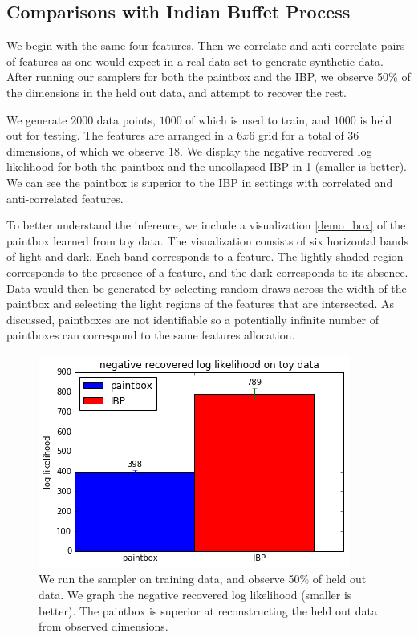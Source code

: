 \documentclass{article}
\begin{document}
\subsection{Comparisons with Indian Buffet Process}

We begin with the same four features. Then we correlate and anti-correlate pairs of features as one would expect in a real data set to generate synthetic data.  After running our samplers for both the paintbox and the IBP, we observe 50\% of the dimensions in the held out data, and attempt to recover the rest.  

We generate $2000$ data points, $1000$ of which is used to train, and $1000$ is held out for testing.  The features are arranged in a $6x6$ grid for a total of $36$ dimensions, of which we observe $18$. We display the negative recovered log likelihood for both the paintbox and the uncollapsed IBP in \ref{demo} (smaller is better).  We can see the paintbox is superior to the IBP in settings with correlated and anti-correlated features. 

To better understand the inference, we include a visualization \ref{demo_box} of the paintbox learned from toy data.  The visualization consists of six horizontal bands of light and dark.  Each band corresponds to a feature.  The lightly shaded region corresponds to the presence of a feature, and the dark corresponds to its absence.  Data would then be generated by selecting random draws across the width of the paintbox and selecting the light regions of the features that are intersected.  As discussed, paintboxes are not identifiable so a potentially infinite number of paintboxes can correspond to the same features allocation. 

\begin{figure}[demo]
\vskip 0.2in
\begin{center}
\centerline{\includegraphics[width=\columnwidth]{demo}}
\caption{We run the sampler on training data, and observe 50\% of held out data.  We graph the negative recovered log likelihood (smaller is better).  The paintbox is superior at reconstructing the held out data from observed dimensions.}
\label{demo}
\end{center}
\vskip -0.2in
\end{figure}
\end{document}
